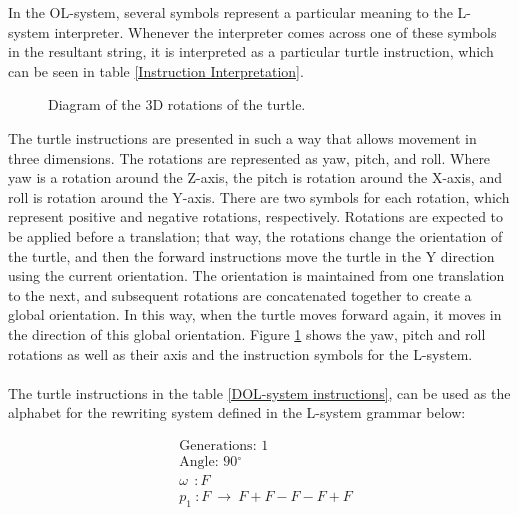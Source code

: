 \noindent
In the OL-system, several symbols represent a particular meaning to the L-system interpreter. Whenever the interpreter comes across one of these symbols in the resultant string, it is interpreted as a particular turtle instruction, which can be seen in table \ref{Instruction Interpretation}.

\begin{figure}[htbp]
	{\centering
		\setlength{\fboxrule}{1pt}
		\vspace{7px}
		\caption{Diagram of the 3D rotations of the turtle.} \label{3D turtle rotations}
	}
\end{figure}
\FloatBarrier

\noindent
The turtle instructions are presented in such a way that allows movement in three dimensions. The rotations are represented as yaw, pitch, and roll. Where yaw is a rotation around the Z-axis, the pitch is rotation around the X-axis, and roll is rotation around the Y-axis. There are two symbols for each rotation, which represent positive and negative rotations, respectively. Rotations are expected to be applied before a translation; that way, the rotations change the orientation of the turtle, and then the forward instructions move the turtle in the Y direction using the current orientation. The orientation is maintained from one translation to the next, and subsequent rotations are concatenated together to create a global orientation. In this way, when the turtle moves forward again, it moves in the direction of this global orientation. Figure \ref{3D turtle rotations} shows the yaw, pitch and roll rotations as well as their axis and the instruction symbols for the L-system.\\
\\
The turtle instructions in the table \ref{DOL-system instructions}, can be used as the alphabet for the rewriting system defined in the L-system grammar below:

\begin{equation} \label{DOL-system example}
\begin{aligned}
	&\text{Generations: 1}\\
	&\text{Angle: 90$^{\circ}$}\\
	&\omega~~ : F \\
	&p_1~ :  F~ \rightarrow~ F+F-F-F+F\\
\end{aligned}
\end{equation}

